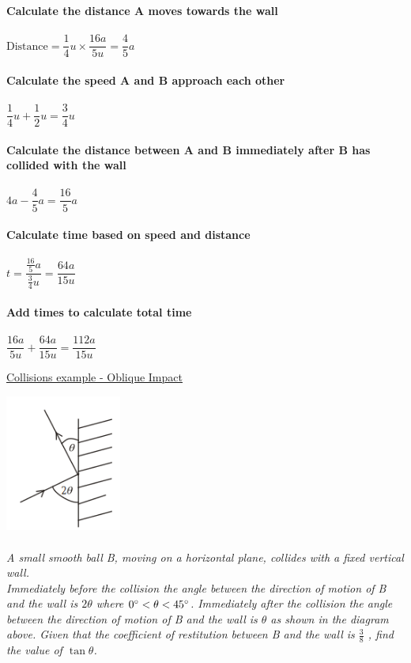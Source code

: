 \documentclass{article}[18pt]
\begin{document}
\textbf{Calculate the distance A moves towards the wall}\\
\\
$\text{Distance}=\dfrac{1}{4}u\times\dfrac{16a}{5u}=\dfrac{4}{5}a$\\
\\
\textbf{Calculate the speed A and B approach each other}\\
\\
$\dfrac{1}{4}u+\dfrac{1}{2}u=\dfrac{3}{4}u$\\
\\
\textbf{Calculate the distance between A and B immediately after B has collided with the wall}\\
\\
$4a-\dfrac{4}{5}a=\dfrac{16}{5}a$\\
\\
\textbf{Calculate time based on speed and distance}\\
\\
$t=\dfrac{\frac{16}{5}a}{\frac{3}{4}u}=\dfrac{64a}{15u}$\\
\\
\textbf{Add times to calculate total time}\\
\\
$\dfrac{16a}{5u}+\dfrac{64a}{15u}=\dfrac{112a}{15u}$
\newpage
\begin{center}
\underline{\huge Collisions example - Oblique Impact}
\end{center}
\includegraphics[width=1.5in]{oblique.png}\\
\\
\textit{A small smooth ball B, moving on a horizontal plane, collides with a fixed vertical wall.\\
Immediately before the collision the angle between the direction of motion of B and the wall is $2\theta$ where $0\degree < \theta < 45\degree$. Immediately after the collision the angle between the direction of motion
of B and the wall is $\theta$ as shown in the diagram above. Given that the coefficient of restitution
between B and the wall is $\frac{3}{8}$ , find the value of $\tan\theta$.}\\
\end{document}
